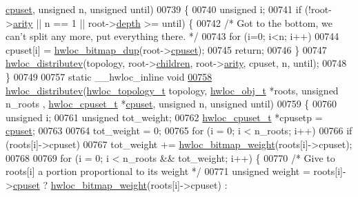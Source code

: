 \begin{DoxyCode}
{{      \hyperlink{a00016_a67925e0f2c47f50408fbdb9bddd0790f}{cpuset}, \textcolor{keywordtype}{unsigned} n, \textcolor{keywordtype}{unsigned} until)
00739 \{
00740   \textcolor{keywordtype}{unsigned} i;
00741   \textcolor{keywordflow}{if} (!root->\hyperlink{a00016_aac3f6da35c9b57599909a44ce2b716c1}{arity} || n == 1 || root->\hyperlink{a00016_a9d82690370275d42d652eccdea5d3ee5}{depth} >= until) \{
00742     \textcolor{comment}{/* Got to the bottom, we can't split any more, put everything there.  */}
00743     \textcolor{keywordflow}{for} (i=0; i<n; i++)
00744       cpuset[i] = \hyperlink{a00065_gaaa4ed76211cd3694dfbea2109fc440be}{hwloc_bitmap_dup}(root->\hyperlink{a00016_a67925e0f2c47f50408fbdb9bddd0790f}{cpuset});
00745     \textcolor{keywordflow}{return};
00746   \}
00747   \hyperlink{a00059_gaf057d7c5e3cb3df897ce527258537619}{hwloc_distributev}(topology, root->\hyperlink{a00016_a04d05403da37bfe17cd63b7c7dd07b1f}{children}, root->\hyperlink{a00016_aac3f6da35c9b57599909a44ce2b716c1}{arity}, cpuset, n, until);
00748 \}
00749 
00757 \textcolor{keyword}{static} \_\_hwloc\_inline \textcolor{keywordtype}{void}
\hypertarget{a00031_source_l00758}{}\hyperlink{a00059_gaf057d7c5e3cb3df897ce527258537619}{00758} \hyperlink{a00059_gaf057d7c5e3cb3df897ce527258537619}{hwloc_distributev}(\hyperlink{a00039_ga9d1e76ee15a7dee158b786c30b6a6e38}{hwloc_topology_t} topology, \hyperlink{a00016}{hwloc_obj_t} *roots, \textcolor{keywordtype}{unsigned} n\_roots
      , \hyperlink{a00040_ga4bbf39b68b6f568fb92739e7c0ea7801}{hwloc_cpuset_t} *\hyperlink{a00016_a67925e0f2c47f50408fbdb9bddd0790f}{cpuset}, \textcolor{keywordtype}{unsigned} n, \textcolor{keywordtype}{unsigned} until)
00759 \{
00760   \textcolor{keywordtype}{unsigned} i;
00761   \textcolor{keywordtype}{unsigned} tot\_weight;
00762   \hyperlink{a00040_ga4bbf39b68b6f568fb92739e7c0ea7801}{hwloc_cpuset_t} *cpusetp = \hyperlink{a00016_a67925e0f2c47f50408fbdb9bddd0790f}{cpuset};
00763 
00764   tot\_weight = 0;
00765   \textcolor{keywordflow}{for} (i = 0; i < n\_roots; i++)
00766     \textcolor{keywordflow}{if} (roots[i]->cpuset)
00767       tot\_weight += \hyperlink{a00065_ga12d520387be74f849f191d7a06ac325c}{hwloc_bitmap_weight}(roots[i]->cpuset);
00768 
00769   \textcolor{keywordflow}{for} (i = 0; i < n\_roots && tot\_weight; i++) \{
00770     \textcolor{comment}{/* Give to roots[i] a portion proportional to its weight */}
00771     \textcolor{keywordtype}{unsigned} weight = roots[i]->\hyperlink{a00016_a67925e0f2c47f50408fbdb9bddd0790f}{cpuset} ? \hyperlink{a00065_ga12d520387be74f849f191d7a06ac325c}{hwloc_bitmap_weight}(roots[i]->cpuset) : 
}}
\end{DoxyCode}
